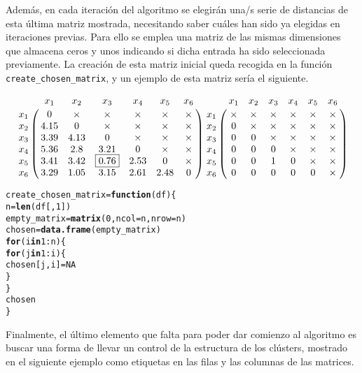 \documentclass[12pt]{report}\usepackage[]{graphicx}\usepackage[dvipsnames]{xcolor}
\makeatletter
\newcommand{\hlnum}[1]{\textcolor[rgb]{0.686,0.059,0.569}{#1}}%
\newcommand{\hlopt}[1]{\textcolor[rgb]{0,0,0}{#1}}%
\newcommand{\hlstd}[1]{\textcolor[rgb]{0.345,0.345,0.345}{#1}}%
\newcommand{\hlkwa}[1]{\textcolor[rgb]{0.161,0.373,0.58}{\textbf{#1}}}%
\newcommand{\hlkwb}[1]{\textcolor[rgb]{0.69,0.353,0.396}{#1}}%
\newcommand{\hlkwc}[1]{\textcolor[rgb]{0.333,0.667,0.333}{#1}}%
\newcommand{\hlkwd}[1]{\textcolor[rgb]{0.737,0.353,0.396}{\textbf{#1}}}%
\newenvironment{kframe}{%
 \def\at@end@of@kframe{}%
 \ifinner\ifhmode%
  \def\at@end@of@kframe{\end{minipage}}%
  \begin{minipage}{\columnwidth}%
 \fi\fi%
 \def\FrameCommand##1{\hskip\@totalleftmargin \hskip-\fboxsep
 \colorbox{shadecolor}{##1}\hskip-\fboxsep
     \hskip-\linewidth \hskip-\@totalleftmargin \hskip\columnwidth}%
 \MakeFramed {\advance\hsize-\width
   \@totalleftmargin\z@ \linewidth\hsize
   \@setminipage}}%
 {\par\unskip\endMakeFramed%
 \at@end@of@kframe}
\newenvironment{knitrout}{}{} %
\makeatother
\begin{document}
		 		Además, en cada iteración del algoritmo se elegirán una/s serie de distancias de esta última matriz mostrada, necesitando saber cuáles han sido ya elegidas en iteraciones previas. Para ello se emplea una matriz de las mismas dimensiones que almacena ceros y unos indicando si dicha entrada ha sido seleccionada previamente. La creación de esta matriz inicial queda recogida en la función \texttt{create\_chosen\_matrix}, y un ejemplo de esta matriz sería el siguiente. 
		 		
		 		$$
		 		\bordermatrix{
		 			& x_1 & x_2 & x_3 & x_4 & x_5 & x_6 \cr
		 			x_1 & 0 & \times & \times & \times & \times & \times\cr
		 			x_2 & 4.15 & 0 & \times & \times & \times & \times\cr
		 			x_3 & 3.39 & 4.13 & 0 & \times & \times & \times\cr
		 			x_4 & 5.36 & 2.8 & 3.21 & 0 & \times & \times\cr
		 			x_5 & 3.41 & 3.42 & \boxed{0.76} & 2.53 & 0 & \times\cr
		 			x_6 & 3.29 & 1.05 & 3.15 & 2.61 & 2.48 & 0
		 		}
		 		\bordermatrix{
		 			& x_1 & x_2 & x_3 & x_4 & x_5 & x_6 \cr
		 			x_1 & \times & \times & \times & \times & \times & \times\cr
		 			x_2 & 0 & \times & \times & \times & \times & \times\cr
		 			x_3 & 0 & 0 & \times & \times & \times & \times\cr
		 			x_4 & 0 & 0 & 0 & \times & \times & \times\cr
		 			x_5 & 0 & 0 & 1 & 0 & \times & \times\cr
		 			x_6 & 0 & 0 & 0 & 0 & 0 & \times
		 		}
		 		$$
		 		
\begin{knitrout}
\color{fgcolor}\begin{kframe}
\begin{alltt}
\hlstd{create_chosen_matrix} \hlkwb{=} \hlkwa{function}\hlstd{(}\hlkwc{df}\hlstd{) \{}
        \hlstd{n} \hlkwb{=} \hlkwd{len}\hlstd{(df[,} \hlnum{1}\hlstd{])}
        \hlstd{empty_matrix} \hlkwb{=} \hlkwd{matrix}\hlstd{(}\hlnum{0}\hlstd{,} \hlkwc{ncol} \hlstd{= n,} \hlkwc{nrow} \hlstd{= n)}
        \hlstd{chosen} \hlkwb{=} \hlkwd{data.frame}\hlstd{(empty_matrix)}
        \hlkwa{for} \hlstd{(i} \hlkwa{in} \hlnum{1}\hlopt{:}\hlstd{n) \{}
                \hlkwa{for} \hlstd{(j} \hlkwa{in} \hlnum{1}\hlopt{:}\hlstd{i) \{}
                        \hlstd{chosen[j, i]} \hlkwb{=} \hlnum{NA}
                \hlstd{\}}
        \hlstd{\}}
        \hlstd{chosen}
\hlstd{\}}
\end{alltt}
\end{kframe}
\end{knitrout}
		 		
		 		Finalmente, el último elemento que falta para poder dar comienzo al algoritmo es buscar una forma de llevar un control de la estructura de los clústers, mostrado en el siguiente ejemplo como etiquetas en las filas y las columnas de las matrices. 
		 		
\end{document}
